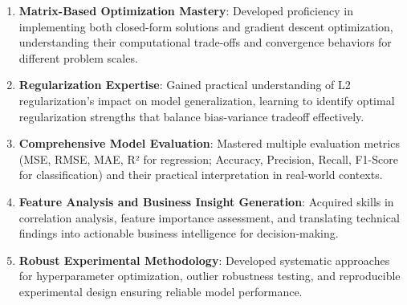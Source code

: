 \documentclass[12pt,a4paper]{article}
\begin{document}
\begin{enumerate}
\item \textbf{Matrix-Based Optimization Mastery}: Developed proficiency in implementing both closed-form solutions and gradient descent optimization, understanding their computational trade-offs and convergence behaviors for different problem scales.

\item \textbf{Regularization Expertise}: Gained practical understanding of L2 regularization's impact on model generalization, learning to identify optimal regularization strengths that balance bias-variance tradeoff effectively.

\item \textbf{Comprehensive Model Evaluation}: Mastered multiple evaluation metrics (MSE, RMSE, MAE, R² for regression; Accuracy, Precision, Recall, F1-Score for classification) and their practical interpretation in real-world contexts.

\item \textbf{Feature Analysis and Business Insight Generation}: Acquired skills in correlation analysis, feature importance assessment, and translating technical findings into actionable business intelligence for decision-making.

\item \textbf{Robust Experimental Methodology}: Developed systematic approaches for hyperparameter optimization, outlier robustness testing, and reproducible experimental design ensuring reliable model performance.
\end{enumerate}
\end{document}
